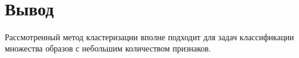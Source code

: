 \documentclass[12pt,a4paper]{article}
\begin{document}
    \begin{center}
    \end{center}
    { \hspace*{\fill} \\}
    
    \section{Вывод}\label{ux432ux44bux432ux43eux434}

Рассмотренный метод кластеризации вполне подходит для задач
классификации множества образов с небольшим количеством признаков.


    
    
    
    
\end{document}
